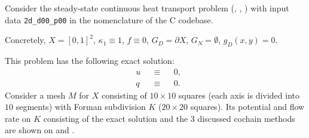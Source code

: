 \begin{example}
  \label{cmc/diffusion/continuous/steady_state/examples/2d_d00_p00-example}
  Consider the steady-state continuous heat transport problem
  (,
   ,
   )
  with input data \verb|2d_d00_p00| in the nomenclature of the C codebase.

  Concretely,
    $X = [0, 1]^2$,
    $\kappa_1 \equiv 1$,
    $f \equiv 0$,
    $G_D = \partial X$,
    $G_N = \emptyset$,
    $g_D(x, y) = 0$.

  This problem has the following exact solution:
  \begin{subequations}
    \begin{alignat}{3}
      & u && \equiv && 0, \\
      & q && \equiv && 0.
    \end{alignat}
  \end{subequations}
  Consider a mesh $M$ for $X$ consisting of $10 \times 10$ squares (each axis is
  divided into $10$ segments) with Forman subdivision $K$ ($20 \times 20$
  squares).
  Its potential and flow rate on $K$ consisting of the exact solution and the
  $3$ discussed cochain methods are shown on
  and
  .
\end{example}
